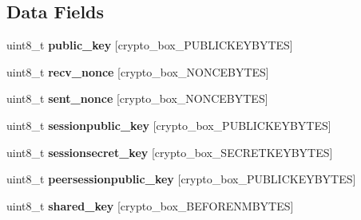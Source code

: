 \subsection*{Data Fields}
\begin{DoxyCompactItemize}
\item 
\hypertarget{struct_crypto___connection_aaa806bb1136fb3d4b5d8d8970b596ff7}{uint8\+\_\+t {\bfseries public\+\_\+key} \mbox{[}crypto\+\_\+box\+\_\+\+P\+U\+B\+L\+I\+C\+K\+E\+Y\+B\+Y\+T\+E\+S\mbox{]}}\label{struct_crypto___connection_aaa806bb1136fb3d4b5d8d8970b596ff7}

\item 
\hypertarget{struct_crypto___connection_aae0467706f97aa3ef23e5dc9c3c199d7}{uint8\+\_\+t {\bfseries recv\+\_\+nonce} \mbox{[}crypto\+\_\+box\+\_\+\+N\+O\+N\+C\+E\+B\+Y\+T\+E\+S\mbox{]}}\label{struct_crypto___connection_aae0467706f97aa3ef23e5dc9c3c199d7}

\item 
\hypertarget{struct_crypto___connection_a9df0e00e8f493ed6cd1ff45e7da33c0d}{uint8\+\_\+t {\bfseries sent\+\_\+nonce} \mbox{[}crypto\+\_\+box\+\_\+\+N\+O\+N\+C\+E\+B\+Y\+T\+E\+S\mbox{]}}\label{struct_crypto___connection_a9df0e00e8f493ed6cd1ff45e7da33c0d}

\item 
\hypertarget{struct_crypto___connection_a6e74fbae398c7966800ee80f7b93dbfa}{uint8\+\_\+t {\bfseries sessionpublic\+\_\+key} \mbox{[}crypto\+\_\+box\+\_\+\+P\+U\+B\+L\+I\+C\+K\+E\+Y\+B\+Y\+T\+E\+S\mbox{]}}\label{struct_crypto___connection_a6e74fbae398c7966800ee80f7b93dbfa}

\item 
\hypertarget{struct_crypto___connection_a5f38fc9ff1b20b61ffbb56d9e7f5c892}{uint8\+\_\+t {\bfseries sessionsecret\+\_\+key} \mbox{[}crypto\+\_\+box\+\_\+\+S\+E\+C\+R\+E\+T\+K\+E\+Y\+B\+Y\+T\+E\+S\mbox{]}}\label{struct_crypto___connection_a5f38fc9ff1b20b61ffbb56d9e7f5c892}

\item 
\hypertarget{struct_crypto___connection_ac040d4ba2a22ee327952009e7396bb2f}{uint8\+\_\+t {\bfseries peersessionpublic\+\_\+key} \mbox{[}crypto\+\_\+box\+\_\+\+P\+U\+B\+L\+I\+C\+K\+E\+Y\+B\+Y\+T\+E\+S\mbox{]}}\label{struct_crypto___connection_ac040d4ba2a22ee327952009e7396bb2f}

\item 
\hypertarget{struct_crypto___connection_a81ead9fac55a0cedc30a96253a2c5119}{uint8\+\_\+t {\bfseries shared\+\_\+key} \mbox{[}crypto\+\_\+box\+\_\+\+B\+E\+F\+O\+R\+E\+N\+M\+B\+Y\+T\+E\+S\mbox{]}}\label{struct_crypto___connection_a81ead9fac55a0cedc30a96253a2c5119}


\end{DoxyCompactItemize}
